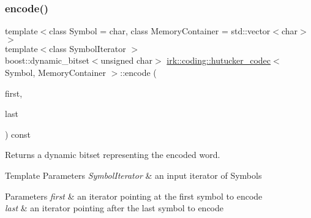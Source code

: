 \subsubsection{\texorpdfstring{encode()}{encode()}\hspace{0.1cm}{\footnotesize\ttfamily [1/3]}}
{\footnotesize\ttfamily template$<$class Symbol  = char, class Memory\+Container  = std\+::vector$<$char$>$$>$ \\
template$<$class Symbol\+Iterator $>$ \\
boost\+::dynamic\+\_\+bitset$<$unsigned char$>$ \mbox{\hyperlink{classirk_1_1coding_1_1hutucker__codec}{irk\+::coding\+::hutucker\+\_\+codec}}$<$ Symbol, Memory\+Container $>$\+::encode (\begin{DoxyParamCaption}\item[{Symbol\+Iterator}]{first,  }\item[{Symbol\+Iterator}]{last }\end{DoxyParamCaption}) const\hspace{0.3cm}{\ttfamily [inline]}}



Returns a dynamic bitset representing the encoded word. 


\begin{DoxyTemplParams}{Template Parameters}
{\em Symbol\+Iterator} & an input iterator of {\ttfamily Symbol}s \\
\hline
\end{DoxyTemplParams}

\begin{DoxyParams}{Parameters}
{\em first} & an iterator pointing at the first symbol to encode \\
\hline
{\em last} & an iterator pointing after the last symbol to encode \\
\hline
\end{DoxyParams}
\mbox{\label{classirk_1_1coding_1_1hutucker__codec_a5acf6a2691318d5b6a1451800a4e4317}} 
